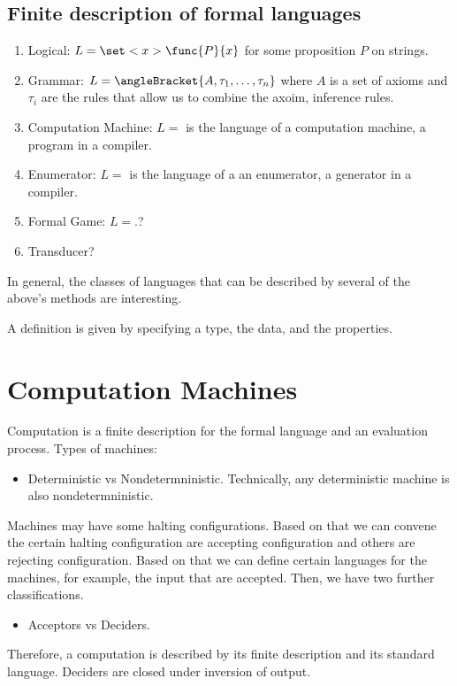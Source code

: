 \subsection{Finite description of formal languages}
\begin{enumerate}
    \item Logical: \(L = \set<x>{\func{P}{x}}\) for some proposition \(P\) on strings.
    \item Grammar: \(L = \angleBracket{A,\tau_1, \dots, \tau_n}\) where \(A\) is a set of axioms and \(\tau_i\) are the rules that allow us to combine the axoim, inference rules.
    \item Computation Machine: \(L = \) is the language of a computation machine, a program in a compiler.
    \item Enumerator: \(L = \) is the language of a an enumerator, a generator in a compiler.
    \item Formal Game: \(L = \).?
    \item Transducer?
\end{enumerate}
In general, the classes of languages that can be described by several of the above's methods are interesting.

A definition is given by specifying a type, the data, and the properties.

\section{Computation Machines}

Computation is a finite description for the formal language and an evaluation process.
Types of machines:
\begin{itemize}
    \item Deterministic vs Nondetermninistic. Technically, any deterministic machine is also nondetermninistic.
\end{itemize}
Machines may have some halting configurations. Based on that we can convene the certain halting configuration are accepting configuration and others are rejecting configuration. Based on that we can define certain languages for the machines, for example, the input that are accepted. Then, we have two further classifications.
\begin{itemize}
    \item Acceptors vs Deciders.
\end{itemize}

Therefore, a computation is described by its finite description and its standard language.
Deciders are closed under inversion of output.

